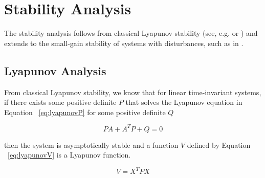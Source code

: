 \documentclass[conference]{IEEEtran}
\begin{document}
\section{Stability Analysis}

The stability analysis follows from classical Lyapunov stability (see, e.g. \cite{Chen1999} or \cite{Khalil2002}) and extends to the small-gain stability of systems with disturbances, such as in \cite{LiberzonQuantDelay2006}.

\subsection{Lyapunov Analysis}

From classical Lyapunov stability, we know that for linear time-invariant systems, if there exists some positive definite $P$ that solves the Lyapunov equation in Equation ~\ref{eq:lyapunovP} for some positive definite $Q$

\begin{equation}
PA+A^TP+Q=0
\label{eq:lyapunovP}
\end{equation}

then the system is asymptotically stable and a function $V$ defined by Equation ~\ref{eq:lyapunovV} is a Lyapunov function.

\begin{equation}
V=X^TPX
\label{eq:lyapunovV}
\end{equation}
\end{document}
